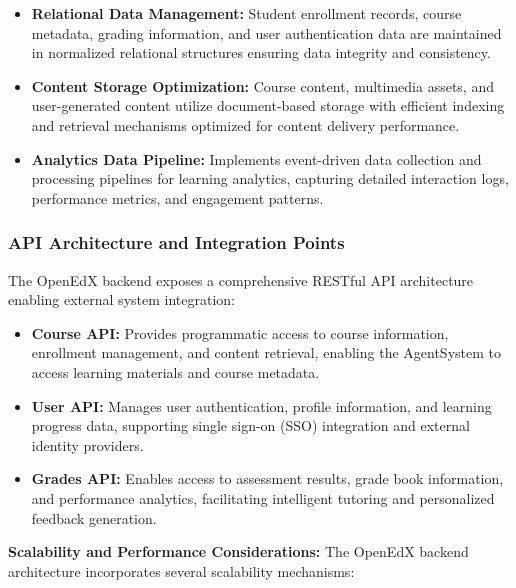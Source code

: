 \documentclass[../Main.tex]{subfiles}
\begin{document}
{{	\begin{itemize}
		\item \textbf{Relational Data Management:} Student enrollment records, course
			metadata, grading information, and user authentication data are maintained
			in normalized relational structures ensuring data integrity and consistency.

		\item \textbf{Content Storage Optimization:} Course content, multimedia assets,
			and user-generated content utilize document-based storage with efficient
			indexing and retrieval mechanisms optimized for content delivery
			performance.

		\item \textbf{Analytics Data Pipeline:} Implements event-driven data
			collection and processing pipelines for learning analytics, capturing detailed
			interaction logs, performance metrics, and engagement patterns.
	\end{itemize}

	\subsubsection{API Architecture and Integration Points}
	\label{section:4.2.2.3_api_architecture_and_integration_points} The OpenEdX backend
	exposes a comprehensive RESTful API architecture enabling external system integration:

	\begin{itemize}
		\item \textbf{Course API:} Provides programmatic access to course
			information, enrollment management, and content retrieval, enabling the AgentSystem
			to access learning materials and course metadata.

		\item \textbf{User API:} Manages user authentication, profile information,
			and learning progress data, supporting single sign-on (SSO) integration and
			external identity providers.

		\item \textbf{Grades API:} Enables access to assessment results, grade book information,
			and performance analytics, facilitating intelligent tutoring and personalized
			feedback generation.
	\end{itemize}

	\textbf{Scalability and Performance Considerations:} The OpenEdX backend architecture
	incorporates several scalability mechanisms:

}}
\end{document}
